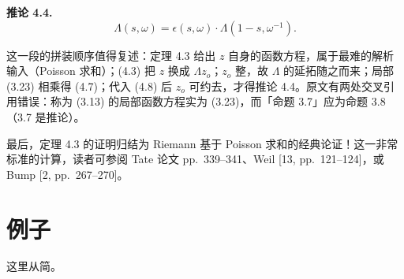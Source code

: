 \medskip\noindent\textbf{推论 4.4.}\quad
\[
\Lambda(s,\omega)=\epsilon(s,\omega)\cdot\Lambda(1-s,\omega^{-1}).
\]

\begin{annote}
这一段的拼装顺序值得复述：定理 4.3 给出 $z$ 自身的函数方程，属于最难的解析输入（Poisson 求和）；(4.3) 把 $z$ 换成 $\Lambda z_o$；$z_o$ 整，故 $\Lambda$ 的延拓随之而来；局部 (3.23) 相乘得 (4.7)；代入 (4.8) 后 $z_o$ 可约去，才得推论 4.4。原文有两处交叉引用错误：称为 (3.13) 的局部函数方程实为 (3.23)，而「命题 3.7」应为命题 3.8（3.7 是推论）。
\par\vspace{0.15em}{\raggedleft 【来源：原书 p.~128（PDF 133）；Tate 论文 §4--§6（A）】\par}
\end{annote}

最后，定理 4.3 的证明归结为 Riemann 基于 Poisson 求和的经典论证！这一非常标准的计算，读者可参阅 Tate 论文 pp.~339--341、Weil [13, pp.~121--124]，或 Bump [2, pp.~267--270]。

\section{例子}

这里从简。

